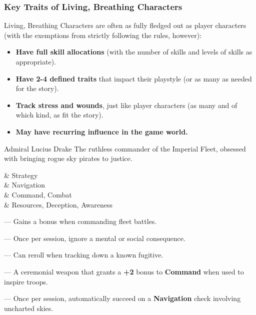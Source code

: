 \subsubsection{Key Traits of Living, Breathing Characters}
Living, Breathing Characters are often as fully fledged out as player characters (with the exemptions from strictly following the rules, however):
\begin{itemize}
    \item \textbf{Have full skill allocations} (with the number of skills and levels of skills as appropriate).
    \item \textbf{Have 2-4 defined traits} that impact their playstyle (or as many as needed for the story).
    \item \textbf{Track stress and wounds}, just like player characters (as many and of which kind, as fit the story).
    \item \textbf{May have recurring influence in the game world.}
\end{itemize}

\begin{Example}{Admiral Lucius Drake}
	The ruthless commander of the Imperial Fleet, obsessed with bringing rogue sky pirates to justice.
  
	\vspace{0.5\baselineskip}
  
	\begin{SkillsBox}
	  \Superior & Strategy \\
	  \Expert & Navigation \\
	  \Skilled & Command, Combat \\
	  \Novice & Resources, Deception, Awareness \\
	\end{SkillsBox}
  
	\begin{TraitsBox}
	  \item[Master Tactician] — Gains a bonus when commanding fleet battles.
	  \item[Iron Will] — Once per session, ignore a mental or social consequence.
	  \item[Unyielding Pursuit] — Can reroll when tracking down a known fugitive.
	\end{TraitsBox}
  
	\begin{GearBox}
	  \item[Imperial Signet Blade] — A ceremonial weapon that grants a \textbf{+2} bonus to \textbf{Command} when used to inspire troops.
	  \item[Sky Admiral’s Compass] — Once per session, automatically succeed on a \textbf{Navigation} check involving uncharted skies.
	\end{GearBox}
  
	\DamageBox
  \end{Example}

